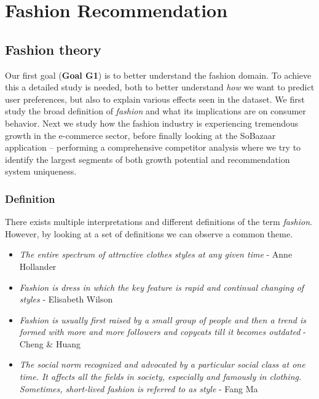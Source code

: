 
\section{Fashion Recommendation}

\subsection{Fashion theory}
\label{subsec:fashion-theory}

Our first goal (\textbf{Goal G1}) is to better understand the fashion domain.
To achieve this a detailed study is needed, both to better understand
\textit{how} we want to predict user preferences, but also to explain various
effects seen in the dataset. We first study the broad definition of
\textit{fashion} and what its implications are on consumer behavior. Next we
study how the fashion industry is experiencing tremendous growth in the
e-commerce sector, before finally looking at the SoBazaar application --
performing a comprehensive competitor analysis where we try to identify the
largest segments of both growth potential and recommendation system
uniqueness.

\subsubsection{Definition}

There exists multiple interpretations and different definitions of the term
\textit{fashion}. However, by looking at a set of definitions we can observe a
common theme.

\begin{itemize}
    \item \textit{The entire spectrum of attractive clothes styles at any given
    time} - Anne Hollander

    \item \textit{Fashion is dress in which the key feature is rapid and continual
    changing of styles} - Elisabeth Wilson

    \item \textit{Fashion is usually first raised by a small group of people
    and then a trend is formed with more and more followers and copycats till
    it becomes outdated} - Cheng \& Huang

    \item \textit{The social norm recognized and advocated by a particular
    social class at one time. It affects all the fields in society, especially
    and famously in clothing. Sometimes, short-lived fashion is referred to as
    style} - Fang Ma \cite{Fang2012}

\end{itemize}

